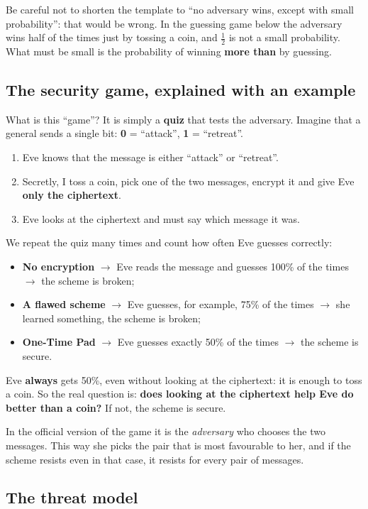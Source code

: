 Be careful not to shorten the template to ``no adversary wins, except with small probability'': that would be wrong. In the guessing game below the adversary wins half of the times just by tossing a coin, and $\frac{1}{2}$ is not a small probability. What must be small is the probability of winning \textbf{more than} by guessing.

\subsection{The security game, explained with an example}

What is this ``game''? It is simply a \textbf{quiz} that tests the adversary. Imagine that a general sends a single bit: \textbf{0} = ``attack'', \textbf{1} = ``retreat''.
\begin{enumerate}
  \item Eve knows that the message is either ``attack'' or ``retreat''.
  \item Secretly, I toss a coin, pick one of the two messages, encrypt it and give Eve \textbf{only the ciphertext}.
  \item Eve looks at the ciphertext and must say which message it was.
\end{enumerate}
We repeat the quiz many times and count how often Eve guesses correctly:
\begin{itemize}
  \item \textbf{No encryption} $\to$ Eve reads the message and guesses 100\% of the times $\to$ the scheme is broken;
  \item \textbf{A flawed scheme} $\to$ Eve guesses, for example, 75\% of the times $\to$ she learned something, the scheme is broken;
  \item \textbf{One-Time Pad} $\to$ Eve guesses exactly 50\% of the times $\to$ the scheme is secure.
\end{itemize}

Eve \textbf{always} gets 50\%, even without looking at the ciphertext: it is enough to toss a coin. So the real question is: \textbf{does looking at the ciphertext help Eve do better than a coin?} If not, the scheme is secure.

In the official version of the game it is the \textit{adversary} who chooses the two messages. This way she picks the pair that is most favourable to her, and if the scheme resists even in that case, it resists for every pair of messages.

\subsection{The threat model}

